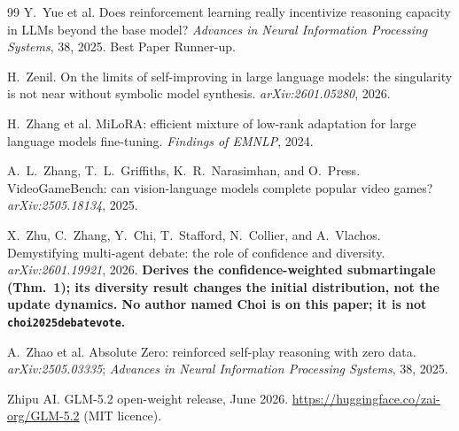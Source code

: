 \documentclass[11pt]{article}
\begin{document}
\begin{thebibliography}{99}
 Y.~Yue et al. Does reinforcement learning really incentivize reasoning capacity in LLMs beyond the base model? \emph{Advances in Neural Information Processing Systems}, 38, 2025. Best Paper Runner-up.

 H.~Zenil. On the limits of self-improving in large language models: the singularity is not near without symbolic model synthesis. \emph{arXiv:2601.05280}, 2026.

 H.~Zhang et al. MiLoRA: efficient mixture of low-rank adaptation for large language models fine-tuning. \emph{Findings of EMNLP}, 2024.

 A.~L.~Zhang, T.~L.~Griffiths, K.~R.~Narasimhan, and O.~Press. VideoGameBench: can vision-language models complete popular video games? \emph{arXiv:2505.18134}, 2025.

 X.~Zhu, C.~Zhang, Y.~Chi, T.~Stafford, N.~Collier, and A.~Vlachos. Demystifying multi-agent debate: the role of confidence and diversity. \emph{arXiv:2601.19921}, 2026. \textbf{Derives the confidence-weighted submartingale (Thm.~1); its diversity result changes the initial distribution, not the update dynamics. No author named Choi is on this paper; it is not \texttt{choi2025debatevote}.}

 A.~Zhao et al. Absolute Zero: reinforced self-play reasoning with zero data. \emph{arXiv:2505.03335}; \emph{Advances in Neural Information Processing Systems}, 38, 2025.

 Zhipu AI. GLM-5.2 open-weight release, June 2026. \url{https://huggingface.co/zai-org/GLM-5.2} (MIT licence).

\end{thebibliography}
\end{document}
